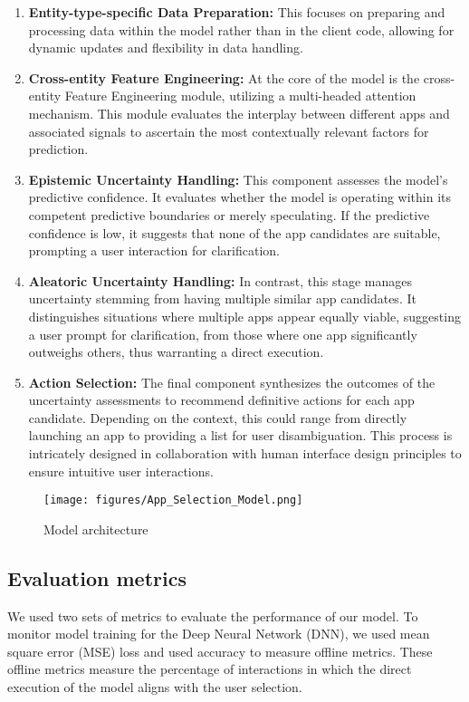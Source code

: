 \begin{enumerate}
    \item \textbf{Entity-type-specific Data Preparation:} This  focuses on preparing and processing data within the model rather than in the client code, allowing for dynamic updates and flexibility in data handling.
    \item \textbf{Cross-entity Feature Engineering:} At the core of the model is the cross-entity Feature Engineering module, utilizing a multi-headed attention mechanism. This module evaluates the interplay between different apps and associated signals to ascertain the most contextually relevant factors for prediction.
    \item \textbf{Epistemic Uncertainty Handling:} This component assesses the model's predictive confidence. It evaluates whether the model is operating within its competent predictive boundaries or merely speculating. If the predictive confidence is low, it suggests that none of the app candidates are suitable, prompting a user interaction for clarification.
    \item \textbf{Aleatoric Uncertainty Handling:} In contrast, this stage manages uncertainty stemming from having multiple similar app candidates. It distinguishes situations where multiple apps appear equally viable, suggesting a user prompt for clarification, from those where one app significantly outweighs others, thus warranting a direct execution.
    \item \textbf{Action Selection:} The final component synthesizes the outcomes of the uncertainty assessments to recommend definitive actions for each app candidate. Depending on the context, this could range from directly launching an app to providing a list for user disambiguation. This process is intricately designed in collaboration with human interface design principles to ensure intuitive user interactions.


\end{enumerate}

\begin{figure}
\centering
\texttt{[image: figures/App\_Selection\_Model.png]}
\caption{\label{Figure 1: App Selection}Model architecture}
\end{figure}

\subsection{Evaluation metrics}
\label{sec:eval_metrics}
We used two sets of metrics to evaluate the performance of our model. To monitor model training for the Deep Neural Network (DNN), we used mean square error (MSE) loss and used accuracy to measure offline metrics. These offline metrics measure the percentage of interactions in which the direct execution of the model aligns with the user selection.

